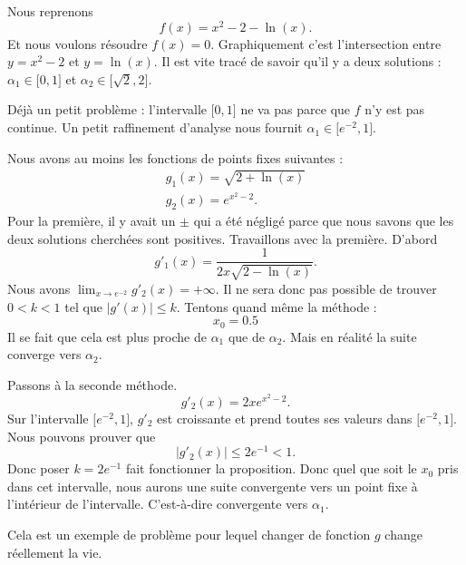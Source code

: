 \begin{example}
    Nous reprenons
    \begin{equation}
        f(x)=x^2-2-\ln(x).
    \end{equation}
    Et nous voulons résoudre \( f(x)=0\). Graphiquement c'est l'intersection entre \( y=x^2-2\) et \( y=\ln(x)\). Il est vite tracé de savoir qu'il y a deux solutions  : \( \alpha_1\in\mathopen[ 0 , 1 \mathclose]\) et \( \alpha_2\in\mathopen[ \sqrt{2} , 2 \mathclose]\).

    Déjà un petit problème : l'intervalle \( \mathopen[ 0 , 1 \mathclose]\) ne va pas parce que \( f\) n'y est pas continue. Un petit raffinement d'analyse nous fournit \( \alpha_1\in\mathopen[ e^{-2} , 1 \mathclose]\).

    Nous avons au moins les fonctions de points fixes suivantes :
    \begin{subequations}
        \begin{align}
            g_1(x)=\sqrt{ 2+\ln(x) }\\
            g_2(x)=e^{x^2-2}.
        \end{align}
    \end{subequations}
    Pour la première, il y avait un \( \pm\) qui a été négligé parce que nous savons que les deux solutions cherchées sont positives.
    Travaillons avec la première. D'abord
    \begin{equation}
        g'_1(x)=\frac{ 1 }{ 2x\sqrt{ 2-\ln(x) } }.
    \end{equation}
    Nous avons \( \lim_{x\to e^{-2}} g'_2(x)=+\infty\). Il ne sera donc pas possible de trouver \( 0<k<1\) tel que \( | g'(x) |\leq k\). Tentons quand même la méthode :
    \begin{equation}
        x_0=0.5
    \end{equation}
    Il se fait que cela est plus proche de \( \alpha_1\) que de \( \alpha_2\). Mais en réalité la suite converge vers \( \alpha_2\).

    Passons à la seconde méthode.
    \begin{equation}
        g'_2(x)=2xe^{x^2-2}.
    \end{equation}
    Sur l'intervalle \( \mathopen[ e^{-2} , 1 \mathclose]\), \( g'_2\) est croissante et prend toutes ses valeurs dans \( \mathopen[ e^{-2} , 1 \mathclose]\). Nous pouvons prouver que
    \begin{equation}
        | g'_2(x) |\leq 2e^{-1}<1.
    \end{equation}
    Donc poser \( k=2e^{-1}\) fait fonctionner la proposition. Donc quel que soit le \( x_0\) pris dans cet intervalle, nous aurons une suite convergente vers un point fixe à l'intérieur de l'intervalle. C'est-à-dire convergente vers \( \alpha_1\).

    Cela est un exemple de problème pour lequel changer de fonction \( g\) change réellement la vie.
\end{example}

